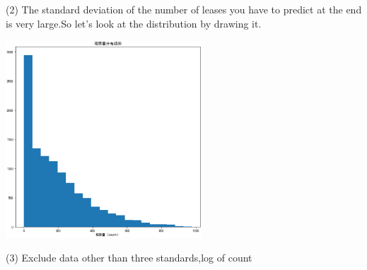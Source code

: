 (2) The standard deviation of the number of leases you have to predict at the end is very large.So let's look at the distribution by drawing it.\\
\begin{center}
  \begin{minipage}{0.5\linewidth}
  \centering
  \includegraphics[width=0.55\textwidth]{pic/count .eps}
\end{minipage}

  \hfill
\end{center}
(3) Exclude data other than three standards,log of count
